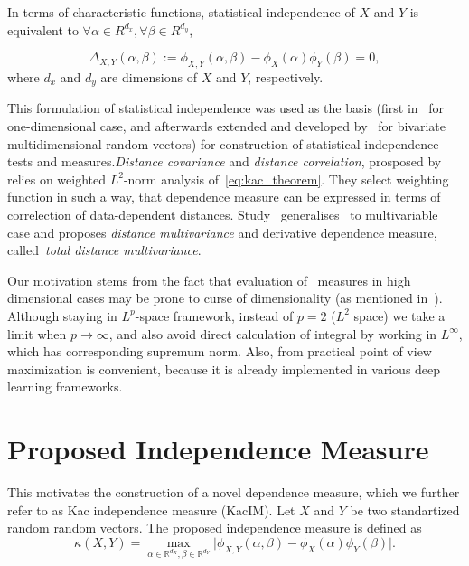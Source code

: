 \documentclass{article}
\begin{document}
In terms of characteristic functions, statistical independence  of $X$ and $Y$ is equivalent to $\forall \alpha \in R^{d_x},\forall \beta \in R^{d_y} $, 

\begin{equation}
\label{eq:kac_theorem}
\Delta_{X,Y}(\alpha, \beta) := \phi_{X,Y}(\alpha,\beta) - \phi_{X}(\alpha) \phi_{Y}(\beta) = 0,
\end{equation}
where $d_{x}$ and $d_{y}$ are dimensions of $X$ and $Y$, respectively.

This formulation of statistical independence was used as the basis (first in~\cite{Feuerverger} for one-dimensional case, and afterwards extended and developed by~\cite{Szekely} for bivariate multidimensional random vectors) for construction of statistical independence tests and measures.\textit{Distance covariance} and \textit{distance correlation}, prosposed by ~\cite{Szekely} relies on weighted $L^{2}$-norm analysis of~\eqref{eq:kac_theorem}. They select weighting function in such a way, that dependence measure can be expressed in terms of correlection of data-dependent distances. Study~\cite{Bottcher} generalises~\cite{Szekely} to multivariable case and proposes \textit{distance multivariance} and derivative dependence measure, called~\textit{total distance multivariance}. 

Our motivation stems from the fact that evaluation of~\cite{Szekely} measures in high dimensional cases may be prone to curse of dimensionality (as mentioned in~\cite{Edlemann}). Although staying in $L^{p}$-space framework, instead of $p = 2$ ($L^{2}$ space) we take a limit when  $p \rightarrow \infty$, and also avoid direct calculation of integral by working in $L^{\infty}$, which has corresponding supremum norm. Also, from practical point of view maximization is convenient, because it is already implemented in various deep learning frameworks. %

\section{Proposed Independence Measure}
\label{section:proposed_method}



\noindent This motivates the construction of a novel dependence measure, which we further refer to as Kac independence measure (KacIM). Let $X$ and $Y$ be two standartized random random vectors. The proposed independence measure is defined as
\begin{equation}
\label{eq:kim}
    \kappa(X,Y) = \max_{\alpha \in \mathbb{R}^{d_{X}}, \beta \in \mathbb{R}^{d_{Y}}} \vert \phi_{X,Y}(\alpha, \beta)  -\phi_{X}(\alpha) \phi_{Y}(\beta) \vert.
\end{equation}
\end{document}
